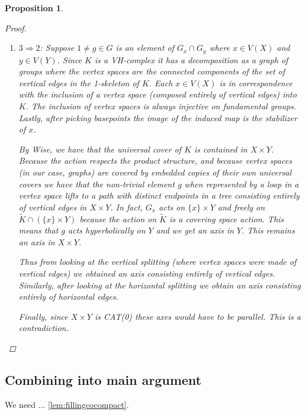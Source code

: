 \documentclass{article}
\theoremstyle{mystyle}
\newtheorem{pro}{Proposition}
\theoremstyle{remark}
\begin{document}
\begin{pro}
\begin{proof}
\begin{enumerate}
    It remains to show that $C/G$ is VH. Is it enough to say that the action respects the tree factors. (The edge partition on the cover descends to a well-defined edge partition on the quotient and attaching maps constructed in the standard way for the quotient alternate between vertical and horizontal edges)
    
    \item $3\Rightarrow 2$: Suppose $1\neq g \in G$ is an element of $G_x\cap G_y$ where $x \in V(X)$ and $y\in V(Y)$. Since $K$ is a VH-complex it has a decomposition as a graph of groups where the vertex spaces are the connected components of the set of vertical edges in the 1-skeleton of $K$. Each $x \in V(X)$ is in correspondence with the inclusion of a vertex space (composed entirely of vertical edges) into $K$. The inclusion of vertex spaces is always injective on fundamental groups. Lastly, after picking basepoints the image of the induced map is the stabilizer of $x$.
    
    By Wise, we have that the universal cover of $K$ is contained in $X \times Y$. Because the action respects the product structure, and because vertex spaces (in our case, graphs) are covered by embedded copies of their own universal covers we have that the non-trivial element $g$ when represented by a loop in a vertex space lifts to a path with distinct endpoints in a tree consisting entirely of vertical edges in $X \times Y$. In fact, $G_x$ acts on $\{x\}\times Y$ and freely on $\widetilde{K} \cap (\{x\}\times Y)$ because the action on $\widetilde{K}$ is a covering space action. This means that $g$ acts hyperbolically on $Y$ and we get an axis in $Y$. This remains an axis in $X \times Y$.
    
    Thus from looking at the vertical splitting (where vertex spaces were made of vertical edges) we obtained an axis consisting entirely of vertical edges. Similarly, after looking at the horizontal splitting we obtain an axis consisting entirely of horizontal edges. 
    
    Finally, since $X \times Y$ is CAT(0) these axes would have to be parallel. This is a contradiction.
\end{enumerate}
\end{proof}
\end{pro}

\subsection{Combining into main argument}
We need ... \ref{lem:fillingcocompact}.
\end{document}

